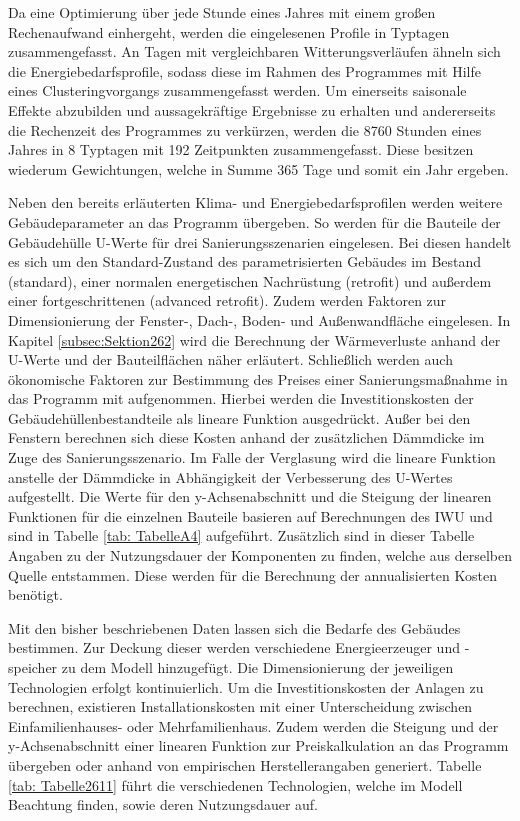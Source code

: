 Da eine Optimierung über jede Stunde eines Jahres mit einem großen Rechenaufwand einhergeht, werden die eingelesenen Profile in Typtagen zusammengefasst. 
An Tagen mit vergleichbaren Witterungsverläufen ähneln sich die Energiebedarfsprofile, sodass diese im Rahmen des Programmes mit Hilfe eines Clusteringvorgangs zusammengefasst werden.
Um einerseits saisonale Effekte abzubilden und aussagekräftige Ergebnisse zu erhalten und andererseits die Rechenzeit des Programmes zu verkürzen, werden die 8760 Stunden eines Jahres in 8 Typtagen mit 192 Zeitpunkten zusammengefasst.
Diese besitzen wiederum Gewichtungen, welche in Summe 365 Tage und somit ein Jahr ergeben.

Neben den bereits erläuterten Klima- und Energiebedarfsprofilen werden weitere Gebäudeparameter an das Programm übergeben.
So werden für die Bauteile der Gebäudehülle U-Werte für drei Sanierungsszenarien eingelesen.
Bei diesen handelt es sich um den Standard-Zustand des parametrisierten Gebäudes im Bestand (standard), einer normalen energetischen Nachrüstung (retrofit) und außerdem einer fortgeschrittenen (advanced retrofit).
Zudem werden Faktoren zur Dimensionierung der Fenster-, Dach-, Boden- und Außenwandfläche eingelesen.
In Kapitel \ref{subsec:Sektion262} wird die Berechnung der Wärmeverluste anhand der U-Werte und der Bauteilflächen näher erläutert.
Schließlich werden auch ökonomische Faktoren zur Bestimmung des Preises einer Sanierungsmaßnahme in das Programm mit aufgenommen. 
Hierbei werden die Investitionskosten der Gebäudehüllenbestandteile als lineare Funktion ausgedrückt.
Außer bei den Fenstern berechnen sich diese Kosten anhand der zusätzlichen Dämmdicke im Zuge des Sanierungsszenario.
Im Falle der Verglasung wird die lineare Funktion anstelle der Dämmdicke in Abhängigkeit der Verbesserung des U-Wertes aufgestellt.
Die Werte für den y-Achsenabschnitt und die Steigung der linearen Funktionen für die einzelnen Bauteile basieren auf Berechnungen des IWU \cite{Hinz.10.08.2015} und sind in Tabelle \ref{tab: TabelleA4} aufgeführt.
Zusätzlich sind in dieser Tabelle Angaben zu der Nutzungsdauer der Komponenten zu finden, welche aus derselben Quelle entstammen.
Diese werden für die Berechnung der annualisierten Kosten benötigt.

Mit den bisher beschriebenen Daten lassen sich die Bedarfe des Gebäudes bestimmen.
Zur Deckung dieser werden verschiedene Energieerzeuger und -speicher zu dem Modell hinzugefügt.
Die Dimensionierung der jeweiligen Technologien erfolgt kontinuierlich.
Um die Investitionskosten der Anlagen zu berechnen, existieren Installationskosten mit einer Unterscheidung zwischen Einfamilienhauses- oder Mehrfamilienhaus.
Zudem werden die Steigung und der y-Achsenabschnitt einer linearen Funktion zur Preiskalkulation an das Programm übergeben oder anhand von empirischen Herstellerangaben generiert.
Tabelle \ref{tab: Tabelle2611} führt die verschiedenen Technologien, welche im Modell Beachtung finden, sowie deren Nutzungsdauer auf.

